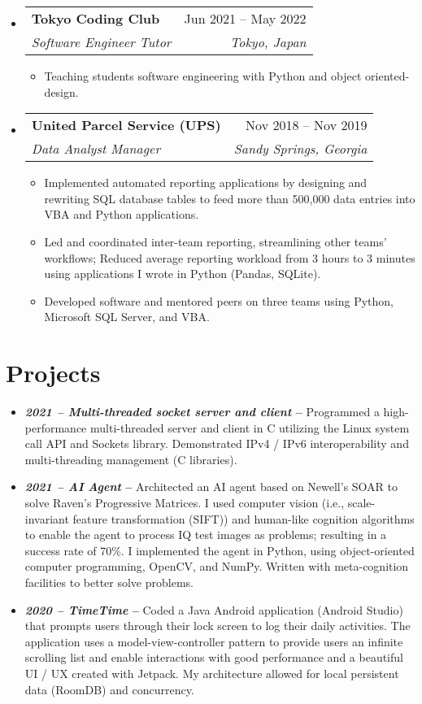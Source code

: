 \documentclass[12pt, letter]{article}
\makeatletter
\newcommand{\resumeItem}[1]{
  \item\small{
    {#1 \vspace{-2pt}}
  }
}
\newcommand{\resumeSubheading}[4]{
  \vspace{-2pt}\item
    \begin{tabular*}{0.97\textwidth}[t]{l@{\extracolsep{\fill}}r}
      \textbf{#1} & #2 \\
      \textit{\small#3} & \textit{\small #4} \\
    \end{tabular*}\vspace{-7pt}
}
\newcommand{\resumeSubHeadingListStart}{\begin{itemize}[leftmargin=0.15in, label={}]}
\newcommand{\resumeSubHeadingListEnd}{\end{itemize}}
\newcommand{\resumeItemListStart}{\begin{itemize}[noitemsep]} %
\newcommand{\resumeItemListEnd}{\end{itemize}\vspace{-16pt}}
\makeatother
\begin{document}
\resumeSubHeadingListStart
  \resumeSubheading
    {Tokyo Coding Club }{Jun 2021 -- May 2022}
    {Software Engineer Tutor}{Tokyo, Japan}
    \resumeItemListStart
      \resumeItem{Teaching students software engineering with  Python and object oriented-design.}
    \resumeItemListEnd
  \resumeSubHeadingListEnd

\resumeSubHeadingListStart
  \resumeSubheading
    {United Parcel Service (UPS)}{Nov 2018 -- Nov 2019}
    {Data Analyst Manager}{Sandy Springs, Georgia}
    \resumeItemListStart
      \resumeItem{Implemented automated reporting applications by designing and rewriting SQL database tables to feed more than 500,000 data entries into VBA and Python applications.}
      \resumeItem{Led and coordinated inter-team reporting, streamlining other teams' workflows; Reduced average reporting workload from 3 hours to 3 minutes using applications I wrote in Python (Pandas, SQLite).}
      \resumeItem{Developed software and mentored peers on three teams using Python, Microsoft SQL Server, and VBA.}
    \resumeItemListEnd
\resumeSubHeadingListEnd

\section{Projects}

\begin{itemize}
  \item {\small \textbf{\textit{2021 -- Multi-threaded socket server and client} --} Programmed a high-performance multi-threaded server and client in C utilizing the Linux system call API and Sockets library. Demonstrated IPv4 / IPv6 interoperability and multi-threading management (C libraries).}
  \item {\small \textbf{\textit{2021 -- AI Agent} --} Architected an AI agent based on Newell's SOAR to solve Raven's Progressive Matrices. I used computer vision (i.e., scale-invariant feature transformation (SIFT)) and human-like cognition algorithms to enable the agent to process IQ test images as problems; resulting in a success rate of 70\%. I implemented the agent in Python, using object-oriented computer programming, OpenCV, and NumPy. Written with meta-cognition facilities to better solve problems.}
  \item {\small \textbf{\textit{2020 -- TimeTime} --}  Coded a Java Android application (Android Studio) that prompts users through their lock screen to log their daily activities. The application uses a model-view-controller pattern to provide users an infinite scrolling list and enable interactions with good performance and a beautiful UI / UX created with Jetpack. My architecture allowed for local persistent data (RoomDB) and concurrency.}
\end{itemize}
\end{document}
